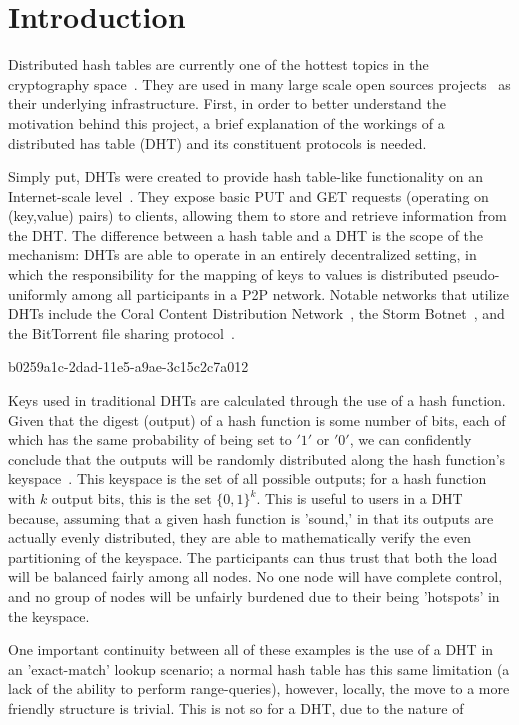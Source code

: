 \documentclass[12pt]{article}
\begin{document}
\section{Introduction}
\par Distributed hash tables are currently one of the hottest topics in the cryptography space~\cite{Stoica:2001dj,Rowstron:2001ea,Ratnasamy:2001wn}. They are used in many large scale open sources projects~\cite{Freitas:2013tb,Xu:2010vs,Perfitt:2010fh} as their underlying infrastructure. First, in order to better understand the motivation behind this project, a brief explanation of the workings of a distributed has table (DHT) and its constituent protocols is needed.

\par Simply put, DHTs were created to provide hash table-like functionality on an Internet-scale level~\cite{Ratnasamy:2001wn}. They expose basic PUT and GET requests (operating on (key,value) pairs) to clients, allowing them to store and retrieve information from the DHT. The difference between a hash table and a DHT is the scope of the mechanism: DHTs are able to operate in an entirely decentralized setting, in which the responsibility for the mapping of keys to values is distributed pseudo-uniformly among all participants in a P2P network. Notable networks that utilize DHTs include the Coral Content Distribution Network~\cite{Freedman:2004vb}, the Storm Botnet~\cite{Holz:2008uk}, and the BitTorrent file sharing protocol~\cite{Cohen:y1_8mBnw}.

b0259a1c-2dad-11e5-a9ae-3c15c2c7a012\par Keys used in traditional DHTs are calculated through the use of a hash function. Given that the digest (output) of a hash function is some number of bits, each of which has the same probability of being set to $'1'$ or $'0'$, we can confidently conclude that the outputs will be randomly distributed along the hash function's keyspace~. This keyspace is the set of all possible outputs; for a hash function with $k$ output bits, this is the set $\{0,1\}^k$. This is useful to users in a DHT because, assuming that a given hash function is 'sound,' in that its outputs are actually evenly distributed, they are able to mathematically verify the even partitioning of the keyspace. The participants can thus trust that both the load will be balanced fairly among all nodes. No one node will have complete control, and no group of nodes will be unfairly burdened due to their being 'hotspots' in the keyspace.~

\par One important continuity between all of these examples is the use of a DHT in an 'exact-match' lookup scenario; a normal hash table has this same limitation (a lack of the ability to perform range-queries), however, locally, the move to a more friendly structure is trivial. This is not so for a DHT, due to the nature of
\printbibliography
\end{document}
